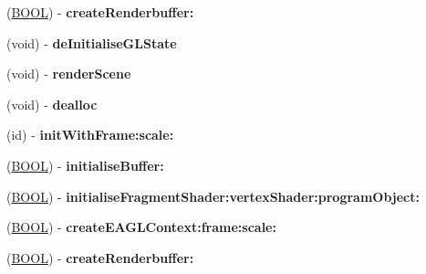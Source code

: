 \begin{DoxyCompactItemize}
\item 
\hypertarget{interface_e_a_g_l_view_a511be998ddda3a6c75bb67c3b21bb440}{(\hyperlink{_ice_types_8h_a050c65e107f0c828f856a231f4b4e788}{B\+O\+O\+L}) -\/ {\bfseries create\+Renderbuffer\+:}}\label{interface_e_a_g_l_view_a511be998ddda3a6c75bb67c3b21bb440}

\item 
\hypertarget{interface_e_a_g_l_view_a5a32476efbeef3241a173d115716b54e}{(void) -\/ {\bfseries de\+Initialise\+G\+L\+State}}\label{interface_e_a_g_l_view_a5a32476efbeef3241a173d115716b54e}

\item 
\hypertarget{interface_e_a_g_l_view_a6a34dc01b846b7e833492f073a8fe0d0}{(void) -\/ {\bfseries render\+Scene}}\label{interface_e_a_g_l_view_a6a34dc01b846b7e833492f073a8fe0d0}

\item 
\hypertarget{interface_e_a_g_l_view_a018b2bd2e8c58c699e0c152ec311e6a2}{(void) -\/ {\bfseries dealloc}}\label{interface_e_a_g_l_view_a018b2bd2e8c58c699e0c152ec311e6a2}

\item 
\hypertarget{interface_e_a_g_l_view_a8b85dec5c17706949d171eace69ed647}{(id) -\/ {\bfseries init\+With\+Frame\+:scale\+:}}\label{interface_e_a_g_l_view_a8b85dec5c17706949d171eace69ed647}

\item 
\hypertarget{interface_e_a_g_l_view_aa7779225db8378788af8e67b40a39766}{(\hyperlink{_ice_types_8h_a050c65e107f0c828f856a231f4b4e788}{B\+O\+O\+L}) -\/ {\bfseries initialise\+Buffer\+:}}\label{interface_e_a_g_l_view_aa7779225db8378788af8e67b40a39766}

\item 
\hypertarget{interface_e_a_g_l_view_add25e50a783df6ffdf06bda1b353465f}{(\hyperlink{_ice_types_8h_a050c65e107f0c828f856a231f4b4e788}{B\+O\+O\+L}) -\/ {\bfseries initialise\+Fragment\+Shader\+:vertex\+Shader\+:program\+Object\+:}}\label{interface_e_a_g_l_view_add25e50a783df6ffdf06bda1b353465f}

\item 
\hypertarget{interface_e_a_g_l_view_a42e3f616047160bc03abf9cd54a7367e}{(\hyperlink{_ice_types_8h_a050c65e107f0c828f856a231f4b4e788}{B\+O\+O\+L}) -\/ {\bfseries create\+E\+A\+G\+L\+Context\+:frame\+:scale\+:}}\label{interface_e_a_g_l_view_a42e3f616047160bc03abf9cd54a7367e}

\item 
\hypertarget{interface_e_a_g_l_view_a511be998ddda3a6c75bb67c3b21bb440}{(\hyperlink{_ice_types_8h_a050c65e107f0c828f856a231f4b4e788}{B\+O\+O\+L}) -\/ {\bfseries create\+Renderbuffer\+:}}\label{interface_e_a_g_l_view_a511be998ddda3a6c75bb67c3b21bb440}


\end{DoxyCompactItemize}
